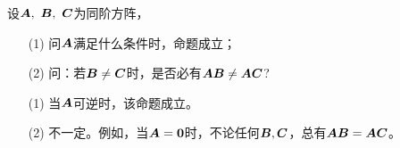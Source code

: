 \begin{frame}
  \begin{footnotesize}
    \begin{li}{43}
      设$\boldsymbol{A},~\boldsymbol{B},~\boldsymbol{C}$为同阶方阵，
      \begin{itemize}
      \item[(1)]问$\boldsymbol{A}$满足什么条件时，命题\blue{$\A\B=\A\C~\Rightarrow~\B=\C$}成立；\\[0.05in]
      \item[(2)] 问：若$\boldsymbol{B}\ne\boldsymbol{C}$时，是否必有$\boldsymbol{A}\boldsymbol{B}\ne\boldsymbol{A}\boldsymbol{C}$?
      \end{itemize}
    \end{li}
    
    \begin{itemize}
    \item[(1)]
      当$\boldsymbol{A}$可逆时，该命题成立。
    \item[(2)]
      不一定。例如，当$\boldsymbol{A}=\boldsymbol{0}$时，不论任何$\boldsymbol{B},\boldsymbol{C}$，总有$\boldsymbol{A}\boldsymbol{B}=\boldsymbol{A}\boldsymbol{C}$。

    \end{itemize}

  \end{footnotesize}
\end{frame}


